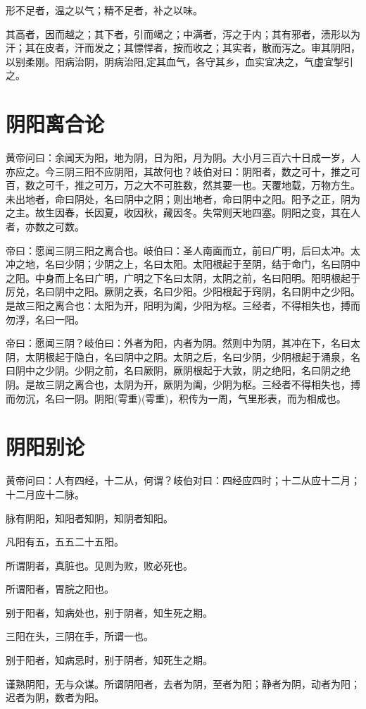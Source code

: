 \documentclass{article}%
\begin{document}
形不足者，温之以气；精不足者，补之以味。

其高者，因而越之；其下者，引而竭之；中满者，泻之于内；其有邪者，渍形以为汗；其在皮者，汗而发之；其慓悍者，按而收之；其实者，散而泻之。审其阴阳，以别柔刚。阳病治阴，阴病治阳,定其血气，各守其乡，血实宜决之，气虚宜掣引之。
\section{阴阳离合论}
黄帝问曰：余闻天为阳，地为阴，日为阳，月为阴。大小月三百六十日成一岁，人亦应之。今三阴三阳不应阴阳，其故何也？岐伯对曰：阴阳者，数之可十，推之可百，数之可千，推之可万，万之大不可胜数，然其要一也。天覆地载，万物方生。未出地者，命曰阴处，名曰阴中之阴；则出地者，命曰阴中之阳。阳予之正，阴为之主。故生因春，长因夏，收因秋，藏因冬。失常则天地四塞。阴阳之变，其在人者，亦数之可数。

帝曰：愿闻三阴三阳之离合也。岐伯曰：圣人南面而立，前曰广明，后曰太冲。太冲之地，名曰少阴；少阴之上，名曰太阳。太阳根起于至阴，结于命门，名曰阴中之阳。中身而上名曰广明，广明之下名曰太阴，太阴之前，名曰阳明。阳明根起于厉兑，名曰阴中之阳。厥阴之表，名曰少阳。少阳根起于窍阴，名曰阴中之少阳。是故三阳之离合也：太阳为开，阳明为阖，少阳为枢。三经者，不得相失也，搏而勿浮，名曰一阳。

帝曰：愿闻三阴？岐伯曰：外者为阳，内者为阴。然则中为阴，其冲在下，名曰太阴，太阴根起于隐白，名曰阴中之阴。太阴之后，名曰少阴，少阴根起于涌泉，名曰阴中之少阴。少阴之前，名曰厥阴，厥阴根起于大敦，阴之绝阳，名曰阴之绝阴。是故三阴之离合也，太阴为开，厥阴为阖，少阴为枢。三经者不得相失也，搏而勿沉，名曰一阴。阴阳(雩重)(雩重)，积传为一周，气里形表，而为相成也。
\section{阴阳别论}
黄帝问曰：人有四经，十二从，何谓？岐伯对曰：四经应四时；十二从应十二月；十二月应十二脉。

脉有阴阳，知阳者知阴，知阴者知阳。

凡阳有五，五五二十五阳。

所谓阴者，真脏也。见则为败，败必死也。

所谓阳者，胃脘之阳也。

别于阳者，知病处也，别于阴者，知生死之期。

三阳在头，三阴在手，所谓一也。

别于阳者，知病忌时，别于阴者，知死生之期。

谨熟阴阳，无与众谋。所谓阴阳者，去者为阴，至者为阳；静者为阴，动者为阳；迟者为阴，数者为阳。
\end{document}

